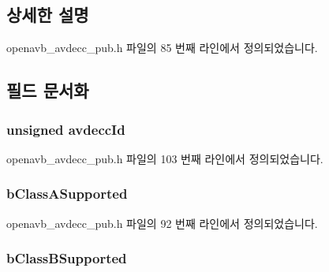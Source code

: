 \subsection{상세한 설명}


openavb\+\_\+avdecc\+\_\+pub.\+h 파일의 85 번째 라인에서 정의되었습니다.



\subsection{필드 문서화}
\subsubsection[{\texorpdfstring{avdecc\+Id}{avdeccId}}]{\setlength{\rightskip}{0pt plus 5cm}unsigned avdecc\+Id}\hypertarget{structopenavb__avdecc__cfg__t_af36c32b6d6a4bbcbc1d96da5543c30d0}{}\label{structopenavb__avdecc__cfg__t_af36c32b6d6a4bbcbc1d96da5543c30d0}


openavb\+\_\+avdecc\+\_\+pub.\+h 파일의 103 번째 라인에서 정의되었습니다.

\subsubsection[{\texorpdfstring{b\+Class\+A\+Supported}{bClassASupported}}]{ b\+Class\+A\+Supported}\hypertarget{structopenavb__avdecc__cfg__t_a92b72de21ef7bb1fd3bb604bc6863e0c}{}\label{structopenavb__avdecc__cfg__t_a92b72de21ef7bb1fd3bb604bc6863e0c}


openavb\+\_\+avdecc\+\_\+pub.\+h 파일의 92 번째 라인에서 정의되었습니다.

\subsubsection[{\texorpdfstring{b\+Class\+B\+Supported}{bClassBSupported}}]{ b\+Class\+B\+Supported}\hypertarget{structopenavb__avdecc__cfg__t_a54c7f875f2801d3e9d921d0b65688735}{}\label{structopenavb__avdecc__cfg__t_a54c7f875f2801d3e9d921d0b65688735}


